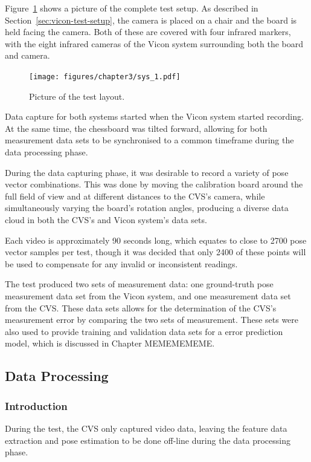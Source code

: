 Figure~\ref{fig:chap3-pic-sys-layout} shows a picture of the complete test setup. As described in Section~\ref{sec:vicon-test-setup}, the camera is placed on a chair and the board is held facing the camera. Both of these are covered with four infrared markers, with the eight infrared cameras of the Vicon system surrounding both the board and camera.  

\begin{figure}
  \centering
  \texttt{[image: figures/chapter3/sys\_1.pdf]}
  \caption{Picture of the test layout.}
\label{fig:chap3-pic-sys-layout}
\end{figure}

Data capture for both systems started when the Vicon system started recording. At the same time, the chessboard was tilted forward, allowing for both measurement data sets to be synchronised to a common timeframe during the data processing phase. 

During the data capturing phase, it was desirable to record a variety of pose vector combinations. This was done  by moving the calibration board around the full field of view and at different distances to the CVS's camera, while simultaneously varying the board's rotation angles, producing a diverse data cloud in both the CVS's and Vicon system's data sets. 

Each video is approximately 90 seconds long, which equates to close to 2700 pose vector samples per test, though it was decided that only 2400 of these points will be used to compensate for any invalid or inconsistent readings. 

The test produced two sets of measurement data: one ground-truth pose measurement data set from the Vicon system, and one measurement data set from the CVS\@. These data sets allows for the determination of the CVS's measurement error by comparing the two sets of measurement. These sets were also used to provide training and validation data sets for a error prediction model, which is discussed in Chapter MEMEMEMEME.\@

\subsection{Data Processing}

\subsubsection{Introduction}

During the test, the CVS only captured video data, leaving the feature data extraction and pose estimation to be done off-line during the data processing phase. 

